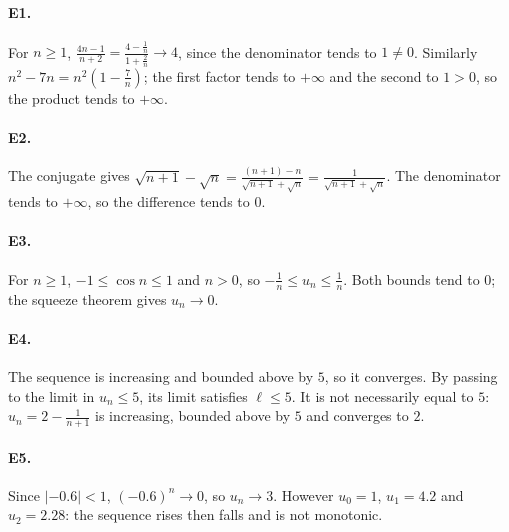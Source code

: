 \paragraph{E1.}For $n\ge1$, $\frac{4n-1}{n+2}=\frac{4-\frac{1}{n}}{1+\frac{2}{n}}\to4$, since the denominator tends to $1\ne0$. Similarly $n^2-7n=n^2(1-\frac{7}{n})$; the first factor tends to $+\infty$ and the second to $1>0$, so the product tends to $+\infty$.

\paragraph{E2.}The conjugate gives $\sqrt{n+1}-\sqrt{n}=\frac{(n+1)-n}{\sqrt{n+1}+\sqrt n}=\frac{1}{\sqrt{n+1}+\sqrt n}$. The denominator tends to $+\infty$, so the difference tends to $0$.

\paragraph{E3.}For $n\ge1$, $-1\le\cos n\le1$ and $n>0$, so $-\frac{1}{n}\le u_n\le\frac{1}{n}$. Both bounds tend to $0$; the squeeze theorem gives $u_n\to0$.

\paragraph{E4.}The sequence is increasing and bounded above by $5$, so it converges. By passing to the limit in $u_n\le5$, its limit satisfies $\ell\le5$. It is not necessarily equal to $5$: $u_n=2-\frac{1}{n+1}$ is increasing, bounded above by $5$ and converges to $2$.

\paragraph{E5.}Since $|-0.6|<1$, $(-0.6)^n\to0$, so $u_n\to3$. However $u_0=1$, $u_1=4.2$ and $u_2=2.28$: the sequence rises then falls and is not monotonic.

